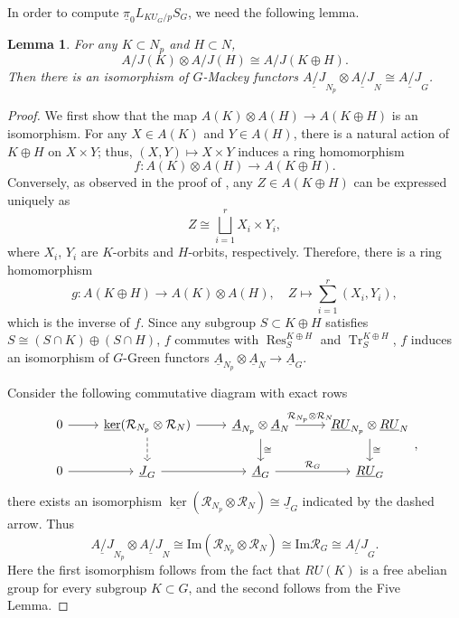 \documentclass{amsart}
\theoremstyle{plain}
\newtheorem{lemma}[theorem]{Lemma}
\theoremstyle{definition}
\theoremstyle{remark}
\begin{document}
In order to compute $\underline{\pi}_0L_{KU_G/p}S_G$, we need the following lemma. 
\begin{lemma}\label{lem:tensor of A/J}
    For any $K\subset N_p$ and $H\subset N$, 
    \[
    A/J(K)\otimes A/J(H)\cong A/J(K\oplus H).
    \]
    Then there is an isomorphism of $G$-Mackey functors $\underline{A/J}_{N_p}\otimes \underline{A/J}_N\cong \underline{A/J}_G$. 
\end{lemma}
\begin{proof}
    We first show that the map $A(K)\otimes A(H)\to A(K\oplus H)$ is an isomorphism. For any $X\in A(K)$ and $Y\in A(H)$, there is a natural action of $K\oplus H$ on $X\times Y$; thus, $(X,Y)\mapsto X\times Y$ induces a ring homomorphism 
    \[
    f:A(K)\otimes A(H)\to A(K\oplus H). 
    \]
    Conversely, as observed in the proof of , any $Z\in A(K\oplus H)$ can be expressed uniquely as
    \[ Z\cong \bigsqcup_{i=1}^r X_i\times Y_i,\]
    where $X_i$, $Y_i$ are $K$-orbits and $H$-orbits, respectively. Therefore, there is a ring homomorphism
    \[
    g:A(K\oplus H)\to A(K)\otimes A(H),\quad Z\mapsto \sum_{i=1}^r (X_i,Y_i),
    \]
    which is the inverse of $f$. Since any subgroup $S \subset K \oplus H$ satisfies $S \cong (S\cap K) \oplus (S\cap H)$, $f$ commutes with $\operatorname{Res}_{S}^{K \oplus H}$ and $\operatorname{Tr}_{S}^{K \oplus H}$, $f$ induces an isomorphism of $G$-Green functors $\underline{A}_{N_p} \otimes \underline{A}_N \to \underline{A}_G$.
    
    Consider the following commutative diagram with exact rows
    \[
    \begin{tikzcd}
    0 \ar[r] & \underline{\ker}(\mathcal{R}_{N_p}\otimes \mathcal{R}_N) \ar[r] \ar[d,dashed] & \underline{A}_{N_p}\otimes\underline{A}_N \ar[r,"\mathcal{R}_{N_p}\otimes \mathcal{R}_N"]\ar[d,"\cong"] &   \underline{RU}_{N_p}\otimes \underline{RU}_N \ar[d,"\cong"]\\
    0 \ar[r] & \underline{J}_G \ar[r]   & \underline{A}_G \ar[r,"\mathcal{R}_G"] &\underline{RU}_G
    \end{tikzcd},
    \]
    there exists an isomorphism $\underline{\ker}(\mathcal{R}_{N_p}\otimes \mathcal{R}_N)\cong \underline{J}_G$ indicated by the dashed arrow. Thus \[\underline{A/J}_{N_p}\otimes \underline{A/J}_N\cong \mathrm{Im}(\mathcal{R}_{N_p}\otimes \mathcal{R}_N)\cong \mathrm{Im}\mathcal{R}_G\cong \underline{A/J}_G.\]
    Here the first isomorphism follows from the fact that $RU(K)$ is a free abelian group for every subgroup $K\subset G$, and the second follows from the Five Lemma.
\end{proof}
\end{document}
